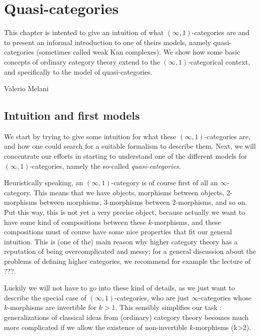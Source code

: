 \chapter{Quasi-categories}

\begin{refsection}

This chapter is intented to give an intuition of what $(\infty,1)$-categories are and to present an informal introduction to one of theirs models, namely quasi-categories (sometimes called weak Kan complexes). We show how some basic concepts of ordinary category theory extend to the $(\infty,1)$-categorical context, and specifically to the model of quasi-categories.

\begin{flushright}
Valerio Melani
\end{flushright}

\section{Intuition and first models}

We start by trying to give some intuition for what these $(\infty,1)$-categories are, and how one could search for a suitable formalism to describe them. Next, we will concentrate our efforts in starting to understand one of the different models for $(\infty,1)$-categories, namely the so-called \emph{quasi-categories}.

Heuristically speaking, an $(\infty,1)$-category is of course first of all an $\infty$-category. This means that we have objects, morphisms between objects, 2-morphisms between morphisms, 3-morphisms between 2-morphisms, and so on. Put this way, this is not yet a very precise object, because actually we want to have some kind of compositions between these $k$-morphisms, and these compositions must of course have some nice properties that fit our general intuition. This is (one of the) main reason why higher category theory has a reputation of being overcomplicated and messy; for a general discussion about the problems of defining higher categories, we recommend for example the lecture of ???.

Luckily we will not have to go into these kind of details, as we just want to describe the special case of $(\infty,1)$-categories, who are just $\infty$-categories whose $k$-morphisms are invertible for $k>1$. This sensibly simplifies our task : generalizations of classical ideas from (ordinary) category theory becomes much more complicated if we allow the existence of non-invertible $k$-morphisms (k>2).


\end{refsection}
